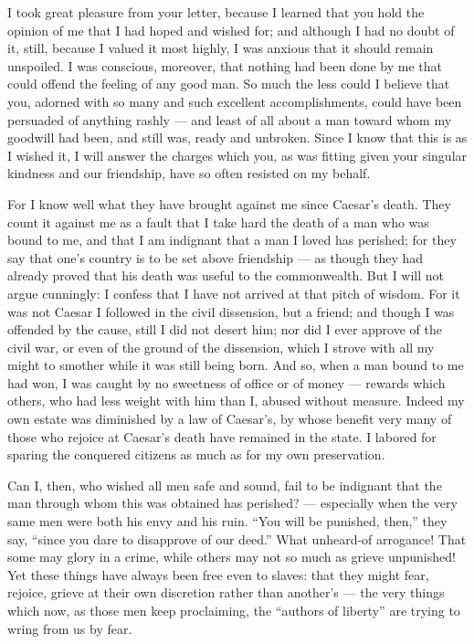 

 I took great pleasure from your letter, because I learned that you hold the opinion of me that I had hoped and wished for; and although I had no doubt of it, still, because I valued it most highly, I was anxious that it should remain unspoiled. I was conscious, moreover, that nothing had been done by me that could offend the feeling of any good man. So much the less could I believe that you, adorned with so many and such excellent accomplishments, could have been persuaded of anything rashly --- and least of all about a man toward whom my goodwill had been, and still was, ready and unbroken. Since I know that this is as I wished it, I will answer the charges which you, as was fitting given your singular kindness and our friendship, have so often resisted on my behalf.

 For I know well what they have brought against me since Caesar's death. They count it against me as a fault that I take hard the death of a man who was bound to me, and that I am indignant that a man I loved has perished; for they say that one's country is to be set above friendship --- as though they had already proved that his death was useful to the commonwealth. But I will not argue cunningly: I confess that I have not arrived at that pitch of wisdom. For it was not Caesar I followed in the civil dissension, but a friend; and though I was offended by the cause, still I did not desert him; nor did I ever approve of the civil war, or even of the ground of the dissension, which I strove with all my might to smother while it was still being born. And so, when a man bound to me had won, I was caught by no sweetness of office or of money --- rewards which others, who had less weight with him than I, abused without measure. Indeed my own estate was diminished by a law of Caesar's, by whose benefit very many of those who rejoice at Caesar's death have remained in the state. I labored for sparing the conquered citizens as much as for my own preservation.

 Can I, then, who wished all men safe and sound, fail to be indignant that the man through whom this was obtained has perished? --- especially when the very same men were both his envy and his ruin. ``You will be punished, then,'' they say, ``since you dare to disapprove of our deed.'' What unheard-of arrogance! That some may glory in a crime, while others may not so much as grieve unpunished! Yet these things have always been free even to slaves: that they might fear, rejoice, grieve at their own discretion rather than another's --- the very things which now, as those men keep proclaiming, the ``authors of liberty'' are trying to wring from us by fear.

